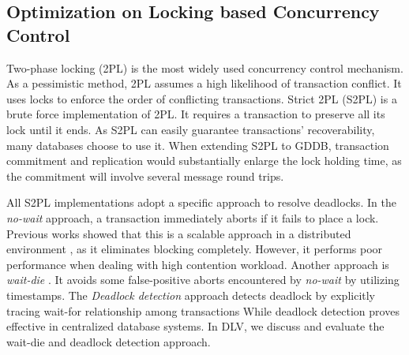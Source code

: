 \documentclass[conference]{IEEEtran}
\begin{document}
\subsection{Optimization on Locking based Concurrency Control}
Two-phase locking (2PL) is the most widely used concurrency control mechanism.
As a pessimistic method, 2PL assumes a high likelihood of transaction conflict.
It uses locks to enforce the order of conflicting transactions.
Strict 2PL (S2PL) is a brute force implementation of 2PL. 
It requires a transaction to preserve all its lock until it ends.
As S2PL can easily guarantee transactions' recoverability, many databases choose to use it.
When extending S2PL to GDDB, transaction commitment and replication would substantially enlarge the lock holding time,
as the commitment will involve several message round trips.

All S2PL implementations adopt a specific approach to resolve deadlocks.
In the \emph{no-wait}
\cite{EvaluationOfCC:journals/pvldb/HardingAPS17}
approach, a transaction immediately aborts if it fails to place a lock.
Previous works showed that this is a scalable approach in a distributed environment \cite{EvaluationCC1000Cores:journals/pvldb/YuBPDS14}\cite{EvaluationOfCC:journals/pvldb/HardingAPS17},
as it eliminates blocking completely.
However, it performs poor performance when dealing with high contention workload.
Another approach is \emph{wait-die} \cite{LockNoWait:journals/csur/BernsteinG81}. 
It avoids some false-positive aborts encountered by \emph{no-wait} by utilizing timestamps.
The \emph{Deadlock detection} approach \cite{LockCC:conf/ds/GrayLPT76} detects deadlock by explicitly tracing wait-for relationship among transactions
While deadlock detection proves effective in centralized database systems\cite{MySQL}\cite{PostgreSQL}.
In DLV, we discuss and evaluate the wait-die and deadlock detection approach.
\end{document}
